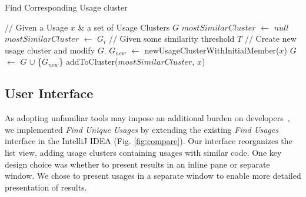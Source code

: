 \documentclass[conference]{IEEEtran}
\begin{document}
\begin{algorithm}
\label{algo2}
    \caption{Find Corresponding Usage cluster} 
    \begin{algorithmic}[1]
    \State // Given a Usage $x$ \& a set of Usage Clusters $G$
    \State $mostSimilarCluster$ $\leftarrow$ $null$
    \State $mostSimilarCluster$ $\leftarrow$ $G_{i}$
    \EndIf
    \EndFor
    \State // Given some similarity threshold $T$
        \State // Create new usage cluster and modify $G$.
        \State $G_{new}$ $\leftarrow$ newUsageClusterWithInitialMember($x$)
        \State $G$ $\leftarrow$ $G$ $\cup$ \{$G_{new}$\}
    \Else
    \State addToCluster($mostSimilarCluster$, $x$)
    \EndIf
    \end{algorithmic} 
\end{algorithm}



\subsection{User Interface}
As adopting unfamiliar tools may impose an additional burden on developers~\cite{adaption2002}, we implemented \textit{Find Unique Usages} by extending the existing \textit{Find Usages} interface in the IntelliJ IDEA (Fig. \ref{fig:compare}). 
Our interface reorganizes the list view, adding usage clusters containing usages with similar code. %
One key design choice was whether to present results in an inline pane or separate window. We chose to present usages in a separate window to enable more detailed presentation of results. \par






\end{document}
